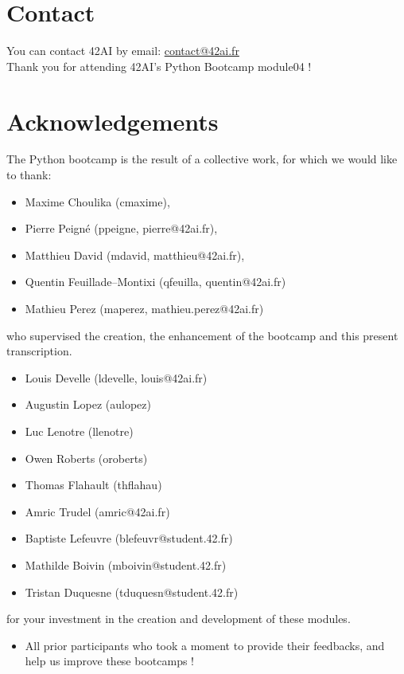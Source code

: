 \section*{Contact}
You can contact 42AI by email: \href{mailto:contact@42ai.fr}{contact@42ai.fr}\\
\newline
Thank you for attending 42AI's Python Bootcamp module04 !

\section*{Acknowledgements}
The Python bootcamp is the result of a collective work, for which we would like to thank:
\begin{itemize}
  \item Maxime Choulika (cmaxime),
  \item Pierre Peigné (ppeigne, pierre@42ai.fr),
  \item Matthieu David (mdavid, matthieu@42ai.fr),
  \item Quentin Feuillade--Montixi (qfeuilla, quentin@42ai.fr)
  \item Mathieu Perez (maperez, mathieu.perez@42ai.fr)
\end{itemize}
who supervised the creation, the enhancement of the bootcamp and this present transcription.

\begin{itemize}
    \item Louis Develle (ldevelle, louis@42ai.fr)
    \item Augustin Lopez (aulopez)
    \item Luc Lenotre (llenotre)
    \item Owen Roberts (oroberts)
    \item Thomas Flahault (thflahau)
    \item Amric Trudel (amric@42ai.fr)
    \item Baptiste Lefeuvre (blefeuvr@student.42.fr)
    \item Mathilde Boivin (mboivin@student.42.fr)
    \item Tristan Duquesne (tduquesn@student.42.fr)
\end{itemize}
for your investment in the creation and development of these modules.

\begin{itemize}
  \item All prior participants who took a moment to provide their feedbacks, and help us improve these bootcamps !
\end{itemize}

  \vfill
\doclicenseThis